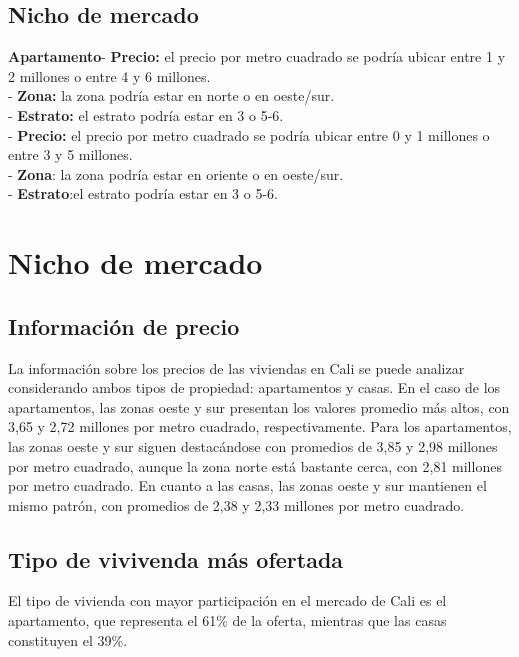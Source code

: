 \documentclass[conference,final,]{IEEEtran}
\begin{document}
\subsection{\textbf{Nicho de mercado}}

\textbf{Apartamento}\newline - \textbf{Precio:} el precio por metro
cuadrado se podría ubicar entre 1 y 2 millones o entre 4 y 6 millones.\\
- \textbf{Zona:} la zona podría estar en norte o en oeste/sur.\\
- \textbf{Estrato:} el estrato podría estar en 3 o 5-6.\\
- \textbf{Precio:} el precio por metro cuadrado se podría ubicar entre 0
y 1 millones o entre 3 y 5 millones.\\
- \textbf{Zona}: la zona podría estar en oriente o en oeste/sur.\\
- \textbf{Estrato}:el estrato podría estar en 3 o 5-6.\\

\section{\textbf{Nicho de mercado}}

\subsection{\textbf{Información de precio}}

La información sobre los precios de las viviendas en Cali se puede
analizar considerando ambos tipos de propiedad: apartamentos y casas. En
el caso de los apartamentos, las zonas oeste y sur presentan los valores
promedio más altos, con 3,65 y 2,72 millones por metro cuadrado,
respectivamente. Para los apartamentos, las zonas oeste y sur siguen
destacándose con promedios de 3,85 y 2,98 millones por metro cuadrado,
aunque la zona norte está bastante cerca, con 2,81 millones por metro
cuadrado. En cuanto a las casas, las zonas oeste y sur mantienen el
mismo patrón, con promedios de 2,38 y 2,33 millones por metro cuadrado.

\subsection{\textbf{Tipo de vivivenda más ofertada}}

El tipo de vivienda con mayor participación en el mercado de Cali es el
apartamento, que representa el 61\% de la oferta, mientras que las casas
constituyen el 39\%.
\end{document}
